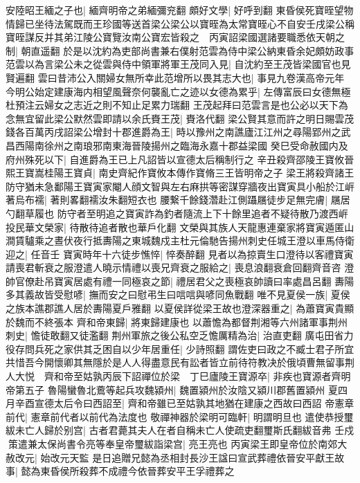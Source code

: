 安陸昭王緬之子也|{
	緬齊明帝之弟緬彌兖翻}
頗好文學|{
	好呼到翻}
東昏侯死寶晊望物情歸已坐待法駕既而王珍國等送首梁公梁公以寶晊為太常寶晊心不自安壬戌梁公稱寶晊謀反并其弟江陵公寶覽汝南公寶宏皆殺之　丙寅詔梁國選諸要職悉依天朝之制|{
	朝直遥翻}
於是以沈約為吏部尚書兼右僕射范雲為侍中梁公納東昏余妃頗妨政事范雲以為言梁公未之從雲與侍中領軍將軍王茂同入見|{
	自沈約至王茂皆梁國官也見賢遍翻}
雲曰昔沛公入關婦女無所幸此范增所以畏其志大也|{
	事見九卷漢高帝元年}
今明公始定建康海内相望風聲奈何襲亂亡之迹以女德為累乎|{
	左傳富辰曰女德無極杜預注云婦女之志近之則不知止足累力瑞翻}
王茂起拜曰范雲言是也公必以天下為念無宜留此梁公默然雲即請以余氏賚王茂|{
	賚洛代翻}
梁公賢其意而許之明日賜雲茂錢各百萬丙戌詔梁公增封十郡進爵為王|{
	時以豫州之南譙廬江江州之尋陽郢州之武昌西陽南徐州之南琅邪南東海晉陵揚州之臨海永嘉十郡益梁國}
癸巳受命赦國内及府州殊死以下|{
	自進爵為王已上凡詔皆以宣德太后稱制行之}
辛丑殺齊邵陵王寶攸晉熙王寶嵩桂陽王寶貞|{
	南史齊紀作寶攸本傳作寶脩三王皆明帝之子}
梁王將殺齊諸王防守猶未急鄱陽王寶寅家閹人顔文智與左右麻拱等密謀穿牆夜出寶寅具小船於江㟁著烏布襦|{
	著則畧翻襦汝朱翻短衣也}
腰繋千餘錢濳赴江側躡屩徒步足無完膚|{
	屩居勺翻草履也}
防守者至明追之寶寅詐為釣者隨流上下十餘里追者不疑待散乃渡西㟁投民華文榮家|{
	待散待追者散也華戶化翻}
文榮與其族人天龍惠連棄家將寶寅遁匿山澗賃驢乘之晝伏夜行抵夀陽之東城魏戍主杜元倫馳告揚州刺史任城王澄以車馬侍衛迎之|{
	任音壬}
寶寅時年十六徒步憔悴|{
	悴奏醉翻}
見者以為掠賣生口澄待以客禮寶寅請喪君斬衰之服澄遣人曉示情禮以喪兄齊衰之服給之|{
	喪息浪翻衰倉回翻齊音咨}
澄帥官僚赴吊寶寅居處有禮一同極哀之節|{
	禮居君父之喪極哀帥讀曰率處昌呂翻}
夀陽多其義故皆受慰喭|{
	撫而安之曰慰弔生曰唁唁與喭同魚戰翻}
唯不見夏侯一族|{
	夏侯之族本譙郡譙人居於夀陽夏戶雅翻}
以夏侯詳從梁王故也澄深器重之|{
	為蕭寶寅貴顯於魏而不終張本}
齊和帝東歸|{
	將東歸建康也}
以蕭憺為都督荆湘等六州諸軍事荆州刺史|{
	憺徒敢翻又徒濫翻}
荆州軍旅之後公私空乏憺厲精為治|{
	治直吏翻}
廣屯田省力役存問兵死之家供其乏困自以少年居重任|{
	少詩照翻}
謂佐吏曰政之不臧士君子所宜共惜吾今開懷卿其無隱於是人人得盡意民有訟者皆立前待符教决於俄頃曹無留事荆人大悦　齊和帝至姑孰丙辰下詔禪位於梁　丁巳廬陵王寶源卒|{
	非疾也寶源者齊明帝第五子}
魯陽蠻魯北鷰等起兵攻魏潁州|{
	魏置潁州於汝陰又潁川郡舊置潁州}
夏四月辛酉宣德太后令曰西詔至|{
	齊和帝雖已至姑孰其地猶在建康之西故曰西詔}
帝憲章前代|{
	憲章前代者以前代為法度也}
敬禪神器於梁明可臨軒|{
	明謂明旦也}
遣使恭授璽紱未亡人歸於别宫|{
	古者君薨其夫人在者自稱未亡人使疏吏翻璽斯氏翻紱音弗}
壬戍策遣兼太保尚書令亮等奉皇帝璽紱詣梁宫|{
	亮王亮也}
丙寅梁王即皇帝位於南郊大赦改元|{
	始改元天監}
是日追贈兄懿為丞相封長沙王諡曰宣武葬禮依晉安平獻王故事|{
	懿為東昏侯所殺葬不成禮今依晉葬安平王孚禮葬之}
